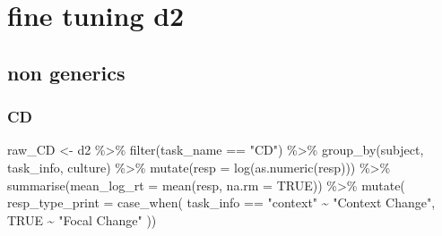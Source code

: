 \documentclass[
]{article}
\newenvironment{Shaded}{\begin{snugshade}}{\end{snugshade}}
\newcommand{\AttributeTok}[1]{\textcolor[rgb]{0.77,0.63,0.00}{#1}}
\newcommand{\ConstantTok}[1]{\textcolor[rgb]{0.00,0.00,0.00}{#1}}
\newcommand{\FunctionTok}[1]{\textcolor[rgb]{0.00,0.00,0.00}{#1}}
\newcommand{\NormalTok}[1]{#1}
\newcommand{\OtherTok}[1]{\textcolor[rgb]{0.56,0.35,0.01}{#1}}
\newcommand{\SpecialCharTok}[1]{\textcolor[rgb]{0.00,0.00,0.00}{#1}}
\newcommand{\StringTok}[1]{\textcolor[rgb]{0.31,0.60,0.02}{#1}}
\begin{document}
\hypertarget{fine-tuning-d2}{%
\section{fine tuning d2}\label{fine-tuning-d2}}

\hypertarget{non-generics-1}{%
\subsection{non generics}\label{non-generics-1}}

\hypertarget{cd}{%
\subsubsection{CD}\label{cd}}

\begin{Shaded}
\begin{Highlighting}[]
\NormalTok{raw\_CD }\OtherTok{\textless{}{-}}\NormalTok{ d2 }\SpecialCharTok{\%\textgreater{}\%} 
  \FunctionTok{filter}\NormalTok{(task\_name }\SpecialCharTok{==} \StringTok{"CD"}\NormalTok{) }\SpecialCharTok{\%\textgreater{}\%} 
  \FunctionTok{group\_by}\NormalTok{(subject, task\_info, culture) }\SpecialCharTok{\%\textgreater{}\%} 
  \FunctionTok{mutate}\NormalTok{(}\AttributeTok{resp =} \FunctionTok{log}\NormalTok{(}\FunctionTok{as.numeric}\NormalTok{(resp))) }\SpecialCharTok{\%\textgreater{}\%} 
  \FunctionTok{summarise}\NormalTok{(}\AttributeTok{mean\_log\_rt =} \FunctionTok{mean}\NormalTok{(resp, }\AttributeTok{na.rm =} \ConstantTok{TRUE}\NormalTok{)) }\SpecialCharTok{\%\textgreater{}\%} 
  \FunctionTok{mutate}\NormalTok{(}
         \AttributeTok{resp\_type\_print =} \FunctionTok{case\_when}\NormalTok{(}
\NormalTok{           task\_info }\SpecialCharTok{==} \StringTok{"context"} \SpecialCharTok{\textasciitilde{}} \StringTok{"Context Change"}\NormalTok{, }
           \ConstantTok{TRUE} \SpecialCharTok{\textasciitilde{}} \StringTok{"Focal Change"}
\NormalTok{         ))}
\end{Highlighting}
\end{Shaded}
\end{document}
